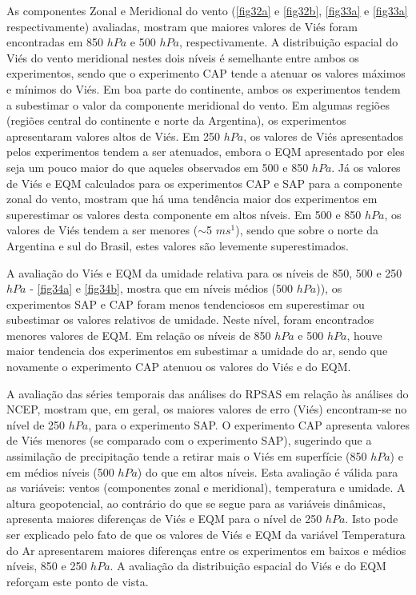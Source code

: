 As componentes Zonal e Meridional do vento (\autoref{fig32a} e \autoref{fig32b}, \autoref{fig33a} e \autoref{fig33a} respectivamente) avaliadas, mostram que maiores valores de Viés foram encontradas em 850 $hPa$ e 500 $hPa$, respectivamente. A distribuição espacial do Viés do vento meridional nestes dois níveis é semelhante entre ambos os experimentos, sendo que o experimento CAP tende a atenuar os valores máximos e mínimos do Viés. Em boa parte do continente, ambos os experimentos tendem a subestimar o valor da componente meridional do vento. Em algumas regiões (regiões central do continente e norte da Argentina), os experimentos apresentaram valores altos de Viés. Em 250 $hPa$, os valores de Viés apresentados pelos experimentos tendem a ser atenuados, embora o EQM apresentado por eles seja um pouco maior do que aqueles observados em 500 e 850 $hPa$. Já os valores de Viés e EQM calculados para os experimentos CAP e SAP para a componente zonal do vento, mostram que há uma tendência maior dos experimentos em superestimar os valores desta componente em altos níveis. Em 500 e 850 $hPa$, os valores de Viés tendem a ser menores ($\sim$5 $ms^{1}$), sendo que sobre o norte da Argentina e sul do Brasil, estes valores são levemente superestimados.

A avaliação do Viés e EQM da umidade relativa para os níveis de 850, 500 e 250 $hPa$ - \autoref{fig34a} e \autoref{fig34b}, mostra que em níveis médios (500 $hPa$)), os experimentos SAP e CAP foram menos tendenciosos em superestimar ou subestimar os valores relativos de umidade. Neste nível, foram encontrados menores valores de EQM. Em relação os níveis de 850 $hPa$ e 500 $hPa$, houve maior tendencia dos experimentos em subestimar a umidade do ar, sendo que novamente o experimento CAP atenuou os valores do Viés e do EQM.

A avaliação das séries temporais das análises do RPSAS em relação às análises do NCEP, mostram que, em geral, os maiores valores de erro (Viés) encontram-se no nível de 250 $hPa$, para o experimento SAP. O experimento CAP apresenta valores de Viés menores (se comparado com o experimento SAP), sugerindo que a assimilação de precipitação tende a retirar mais o Viés em superfície (850 $hPa$) e em médios níveis (500 $hPa$) do que em altos níveis. Esta avaliação é válida para as variáveis: ventos (componentes zonal e meridional), temperatura e umidade. A altura geopotencial, ao contrário do que se segue para as variáveis dinâmicas, apresenta maiores diferenças de Viés e EQM para o nível de 250 $hPa$. Isto pode ser explicado pelo fato de que os valores de Viés e EQM da variável Temperatura do Ar apresentarem maiores diferenças entre os experimentos em baixos e médios níveis, 850 e 250 $hPa$. A avaliação da distribuição espacial do Viés e do EQM reforçam este ponto de vista. 

